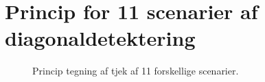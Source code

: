 \section{Princip for 11 scenarier af diagonaldetektering}
\label{app:firkant}

\begin{figure}[!th]
\centering
\begin{tikzpicture}[scale=0.95]
    
    \end{tikzpicture}
\caption[tekst i indholdsfortegnelsen]{Princip tegning af tjek af 11 forskellige scenarier.}
\label{fig:principotte}
\end{figure}
\newpage

